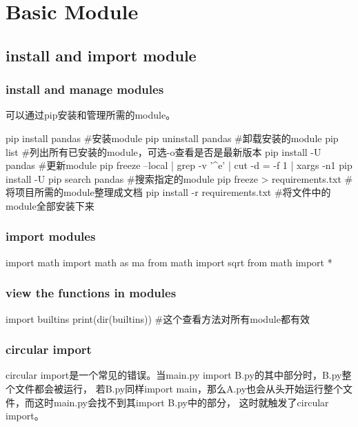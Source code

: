 \section{Basic Module}

  \subsection{install and import module}
    \subsubsection{install and manage modules}
      可以通过pip安装和管理所需的module。
      \begin{codeblock}[language=bash, caption={download modules}]
        pip install pandas  #安装module
        pip uninstall pandas  #卸载安装的module
        pip list #列出所有已安装的module，可选-o查看是否是最新版本
        pip install -U pandas #更新module
        pip freeze --local | grep -v '^\-e' | cut -d = -f 1 | xargs -n1 pip install -U
        pip search pandas #搜索指定的module
        pip freeze > requirements.txt #将项目所需的module整理成文档
        pip install -r requirements.txt #将文件中的module全部安装下来
      \end{codeblock}

    \subsubsection{import modules}
      \begin{codeblock}[language=python, caption={import module}]
        import math
        import math as ma
        from math import sqrt
        from math import *
      \end{codeblock}

    \subsubsection{view the functions in modules}
      \begin{codeblock}[language=python, caption={view the functions in builtin module}]
        import builtins
        print(dir(builtins)) #这个查看方法对所有module都有效
      \end{codeblock}

    \subsubsection{circular import}
      circular import是一个常见的错误。当main.py import B.py的其中部分时，B.py整个文件都会被运行，
      若B.py同样import main，那么A.py也会从头开始运行整个文件，而这时main.py会找不到其import B.py中的部分，
      这时就触发了circular import。

